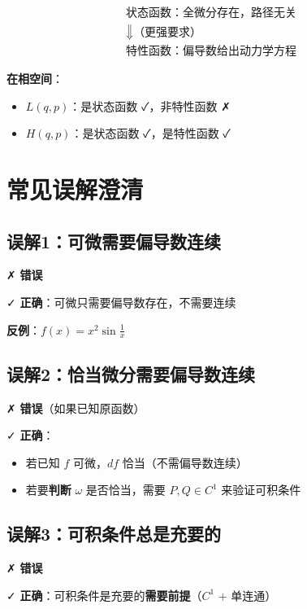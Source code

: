 \documentclass[12pt,a4paper]{article}
\begin{document}
\begin{equation}
\boxed{
\begin{array}{c}
\text{状态函数：全微分存在，路径无关} \\
\Downarrow \text{（更强要求）} \\
\text{特性函数：偏导数给出动力学方程}
\end{array}
}
\end{equation}

\textbf{在相空间}：
\begin{itemize}
\item $L(q,p)$：是状态函数 ✓，非特性函数 ✗
\item $H(q,p)$：是状态函数 ✓，是特性函数 ✓
\end{itemize}

\section{常见误解澄清}

\subsection{误解1：可微需要偏导数连续}

✗ \textbf{错误}

✓ \textbf{正确}：可微只需要偏导数存在，不需要连续

\textbf{反例}：$f(x) = x^2\sin\frac{1}{x}$

\subsection{误解2：恰当微分需要偏导数连续}

✗ \textbf{错误}（如果已知原函数）

✓ \textbf{正确}：
\begin{itemize}
\item 若已知 $f$ 可微，$df$ 恰当（不需偏导数连续）
\item 若要\textbf{判断} $\omega$ 是否恰当，需要 $P, Q \in C^1$ 来验证可积条件
\end{itemize}

\subsection{误解3：可积条件总是充要的}

✗ \textbf{错误}

✓ \textbf{正确}：可积条件是充要的\textbf{需要前提}（$C^1$ + 单连通）
\end{document}
